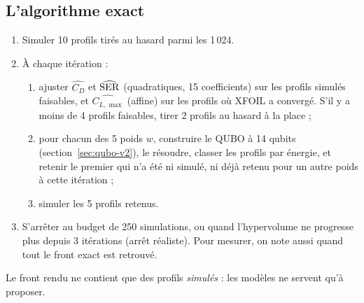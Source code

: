 \subsection{L'algorithme exact}
\begin{tcolorbox}[coursbox,colback=white,colframe=cink,title={Boucle QUBO bi-objectif (V2, \texttt{qubo\_loop}).}]
\begin{enumerate}
\item Simuler 10 profils tirés au hasard parmi les 1\,024.
\item À chaque itération :
\begin{enumerate}
\item ajuster $\widehat{C_D}$ et $\widehat{\rm SER}$ (quadratiques, 15 coefficients) sur les profils simulés faisables, et $\widehat{C_{L,\max}}$ (affine) sur les profils où XFOIL a convergé. S'il y a moins de 4 profils faisables, tirer 2 profils au hasard à la place ;
\item pour chacun des 5 poids $w$, construire le QUBO à 14 qubits (section~\ref{sec:qubo-v2}), le résoudre, classer les profils par énergie, et retenir le premier qui n'a été ni simulé, ni déjà retenu pour un autre poids à cette itération ;
\item simuler les 5 profils retenus.
\end{enumerate}
\item S'arrêter au budget de 250 simulations, ou quand l'hypervolume ne progresse plus depuis 3 itérations (arrêt réaliste). Pour mesurer, on note aussi quand tout le front exact est retrouvé.
\end{enumerate}
Le front rendu ne contient que des profils \emph{simulés} : les modèles ne servent qu'à proposer.
\end{tcolorbox}

